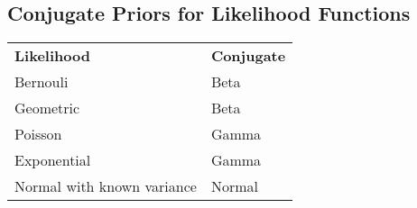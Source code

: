   \subsection{Conjugate Priors for Likelihood Functions}
  
    \begin{tabu} to \linewidth{ X[l] | X[l] }
      \thickhline
      \textbf{Likelihood} & \textbf{Conjugate} \\ \thickhline
      Bernouli & Beta \\ \hline
      Geometric & Beta \\ \hline
      Poisson & Gamma \\ \hline
      Exponential & Gamma \\ \hline
      Normal with known variance & Normal \\ \hline
    \end{tabu}